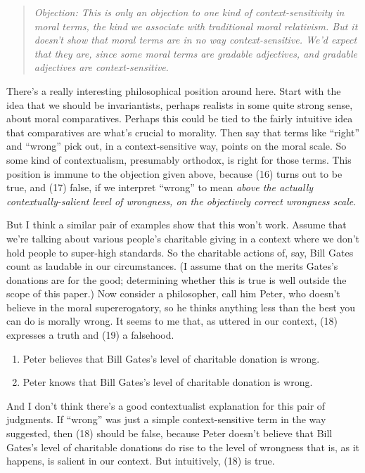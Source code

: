 \begin{quote}
\textit{Objection: This is only an objection to one kind of context-sensitivity in moral terms, the kind we associate with traditional moral relativism. But it doesn't show that moral terms are in no way context-sensitive. We'd expect that they are, since some moral terms are gradable adjectives, and gradable adjectives are context-sensitive}.
\end{quote}

\noindent There's a really interesting philosophical position around here. Start with the idea that we should be invariantists, perhaps realists in some quite strong sense, about moral comparatives. Perhaps this could be tied to the fairly intuitive idea that comparatives are what's crucial to morality. Then say that terms like ``right'' and ``wrong'' pick out, in a context-sensitive way, points on the moral scale. So some kind of contextualism, presumably orthodox, is right for those terms. This position is immune to the objection given above, because (16) turns out to be true, and (17) false, if we interpret ``wrong'' to mean \textit{above the actually contextually-salient level of wrongness, on the objectively correct wrongness scale}.

But I think a similar pair of examples show that this won't work. Assume that we're talking about various people's charitable giving in a context where we don't hold people to super-high standards. So the charitable actions of, say, Bill Gates count as laudable in our circumstances. (I assume that on the merits Gates's donations are for the good; determining whether this is true is well outside the scope of this paper.) Now consider a philosopher, call him Peter, who doesn't believe in the moral supererogatory, so he thinks anything less than the best you can do is morally wrong. It seems to me that, as uttered in our context, (18) expresses a truth and (19) a falsehood.

\begin{enumerate}
\renewcommand{\labelenumi}{(\arabic{enumi})}
\setcounter{enumi}{17}
\item Peter believes that Bill Gates's level of charitable donation is wrong.
\item Peter knows that Bill Gates's level of charitable donation is wrong.
\end{enumerate}
And I don't think there's a good contextualist explanation for this pair of judgments. If ``wrong'' was just a simple context-sensitive term in the way suggested, then (18) should be false, because Peter doesn't believe that Bill Gates's level of charitable donations do rise to the level of wrongness that is, as it happens, is salient in our context. But intuitively, (18) is true.

